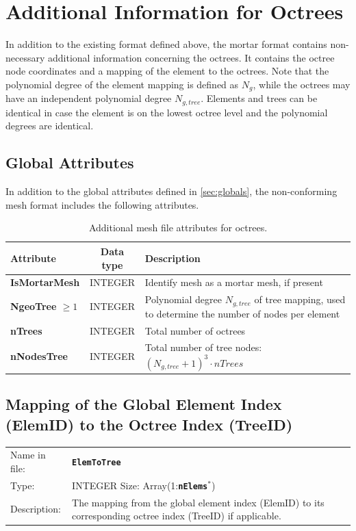 \documentclass[a4paper,headsepline]{scrreprt}
\newcommand\Ngeo{N_g}
\newcommand\NgeoTree{N_{g,tree}}
\newcommand\ttbf[1]{\texttt{\textbf{#1}}}
\newcommand\nElems{\ttbf{nElems}\xspace}
\begin{document}
\newpage
\section{Additional Information for Octrees}

In addition to the existing format defined above, the mortar format contains non-necessary additional information concerning the octrees. It contains the octree node coordinates and a mapping of the element to the octrees. Note that the polynomial degree of the element mapping is defined as $\Ngeo$, while the octrees may have an independent polynomial degree $\NgeoTree$. Elements and trees can be identical in case the element is on the lowest octree level and the polynomial degrees are identical.


\subsection{Global Attributes}
In addition to the global attributes defined in \ref{sec:globals}, the non-conforming mesh format includes the following attributes.

\begin{table}[h!]
\centering
\begin{tabularx}{1.0\textwidth}{|>{\bfseries\ttfamily}l|c|X|} \hline
\normalfont\textbf{Attribute}   & \textbf{Data type}  & \textbf{Description} \\ \hline\hline
IsMortarMesh  & INTEGER & Identify mesh as a mortar mesh, if present \\\hline
NgeoTree $\geq 1$ & INTEGER & Polynomial degree $\NgeoTree$ of tree mapping, used to determine the number of nodes per element \\\hline
nTrees        & INTEGER & Total number of octrees \\\hline
nNodesTree    & INTEGER & Total number of tree nodes: $(\NgeoTree+1)^3 \cdot nTrees$ \\\hline
\end{tabularx}
\caption{Additional mesh file attributes for octrees.}
\end{table}



\subsection{Mapping of the Global Element Index (ElemID) to the Octree Index (TreeID) }
\begin{tabularx}{1.0\textwidth}{lX}
Name in  file: & \textbf{\texttt{ElemToTree}}\\
Type:         & INTEGER \quad Size: Array(1:\nElems$^*$) \\
Description:  & The mapping from the global element index (ElemID) to its corresponding octree index (TreeID) if applicable. \\
\end{tabularx}
\end{document}
